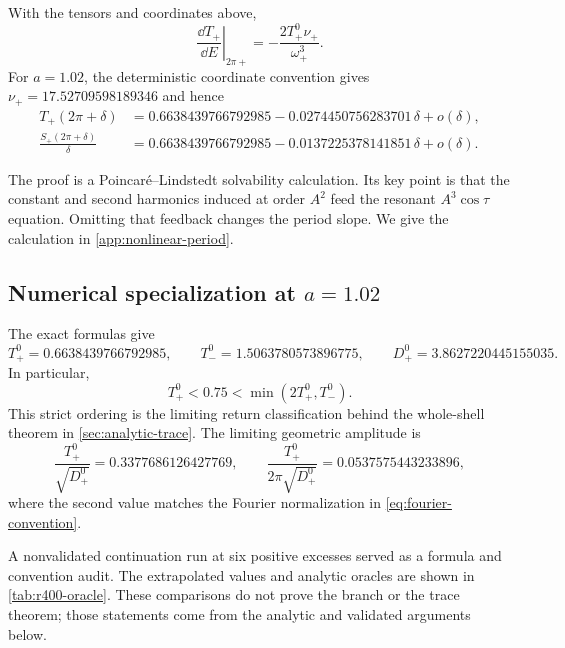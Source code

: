 \begin{proposition}
\label{prop:period-slope}
With the tensors and coordinates above,
\begin{equation}
 \left.\frac{\dd T_+}{\dd E}\right|_{2\pi+}
 =-\frac{2T_+^0\nu_+}{\omega_+^3}.
 \label{eq:period-slope}
\end{equation}
For \(a=1.02\), the deterministic coordinate convention gives
\(\nu_+=17.52709598189346\) and hence
\begin{align}
 T_+(2\pi+\delta)
 &=0.6638439766792985
   -0.0274450756283701\,\delta+o(\delta),
 \label{eq:period-expansion}\\
 \frac{S_+(2\pi+\delta)}{\delta}
 &=0.6638439766792985
   -0.0137225378141851\,\delta+o(\delta).
 \label{eq:action-expansion}
\end{align}
\end{proposition}

The proof is a Poincar\'e--Lindstedt solvability calculation.  Its key point
is that the constant and second harmonics induced at order \(A^2\) feed the
resonant \(A^3\cos\tau\) equation.  Omitting that feedback changes the
period slope.  We give the calculation in \cref{app:nonlinear-period}.

\subsection{Numerical specialization at \texorpdfstring{\(a=1.02\)}{a=1.02}}

The exact formulas give
\begin{equation}
 T_+^0=0.6638439766792985,
 \qquad
 T_-^0=1.5063780573896775,
 \qquad
 D_+^0=3.8627220445155035.
 \label{eq:oracle-numbers}
\end{equation}
In particular,
\begin{equation}
 T_+^0<0.75<\min(2T_+^0,T_-^0).
 \label{eq:window-separation}
\end{equation}
This strict ordering is the limiting return classification behind the
whole-shell theorem in \cref{sec:analytic-trace}.  The limiting geometric
amplitude is
\begin{equation}
 \frac{T_+^0}{\sqrt{D_+^0}}=0.3377686126427769,
 \qquad
 \frac{T_+^0}{2\pi\sqrt{D_+^0}}=0.0537575443233896,
 \label{eq:limiting-amplitudes}
\end{equation}
where the second value matches the Fourier normalization in
\cref{eq:fourier-convention}.

A nonvalidated continuation run at six positive excesses served as a
formula and convention audit.  The extrapolated values and analytic oracles
are shown in \cref{tab:r400-oracle}.  These comparisons do not prove the
branch or the trace theorem; those statements come from the analytic and
validated arguments below.

